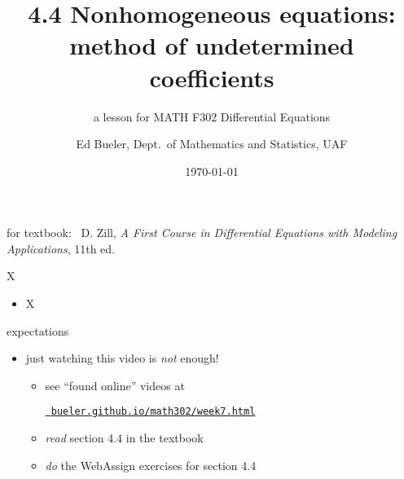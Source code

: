 \documentclass{beamer}
\title{4.4 Nonhomogeneous equations: \\ method of undetermined coefficients}
\subtitle{a lesson for MATH F302 Differential Equations}
\author{Ed Bueler, Dept.~of Mathematics and Statistics, UAF}
\date{\tiny \today}
\begin{document}


\begin{frame}
\titlepage

\centerline{\tiny for textbook: \, D. Zill, \emph{A First Course in Differential Equations with Modeling Applications}, 11th ed.}
\end{frame}


\begin{frame}{X}

\begin{itemize}
\item X
\end{itemize}
\end{frame}


\begin{frame}{expectations}

\begin{itemize}
\item just watching this video is \emph{not} enough!
     \begin{itemize}
     \item see ``found online'' videos at

     \centerline{\href{https://bueler.github.io/math302/week7.html}{\tt \color{cyan} bueler.github.io/math302/week7.html}}
     \item \emph{read} section 4.4 in the textbook
     \item \emph{do} the WebAssign exercises for section 4.4
     \end{itemize}
\end{itemize}
\end{frame}
\end{document}
